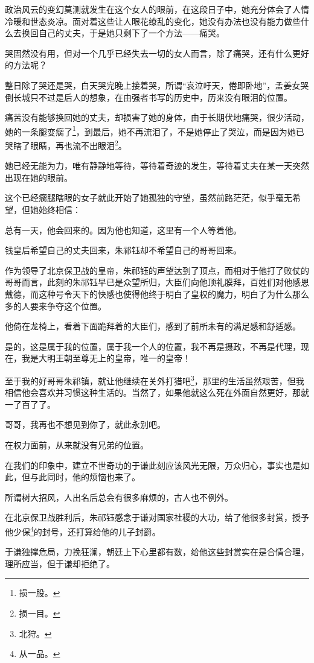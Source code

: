 \begin{multicols}{\theparacolNo}
政治风云的变幻莫测就发生在这个女人的眼前，在这段日子中，她充分体会了人情冷暖和世态炎凉。面对着这些让人眼花缭乱的变化，她没有办法也没有能力做些什么去换回自己的丈夫，于是她只剩下了一个方法——痛哭。

哭固然没有用，但对一个几乎已经失去一切的女人而言，除了痛哭，还有什么更好的方法呢？

整日除了哭还是哭，白天哭完晚上接着哭，所谓“哀泣吁天，倦即卧地”，孟姜女哭倒长城只不过是后人的想象，在由强者书写的历史中，历来没有眼泪的位置。

痛苦没有能够换回她的丈夫，却损害了她的身体，由于长期伏地痛哭，很少活动，她的一条腿变瘸了\footnote{损一股。}，到最后，她不再流泪了，不是她停止了哭泣，而是因为她已哭瞎了眼睛，再也流不出眼泪\footnote{损一目。}。

她已经无能为力，唯有静静地等待，等待着奇迹的发生，等待着丈夫在某一天突然出现在她的眼前。

这个已经瘸腿瞎眼的女子就此开始了她孤独的守望，虽然前路茫茫，似乎毫无希望，但她始终相信：

总有一天，他会回来的。因为他也知道，这里有一个人等着他。

钱皇后希望自己的丈夫回来，朱祁钰却不希望自己的哥哥回来。

作为领导了北京保卫战的皇帝，朱祁钰的声望达到了顶点，而相对于他打了败仗的哥哥而言，此刻的朱祁钰早已是众望所归，大臣们向他顶礼膜拜，百姓们对他感恩戴德，而这种号令天下的快感也使得他终于明白了皇权的魔力，明白了为什么那么多的人要来争夺这个位置。

他倚在龙椅上，看着下面跪拜着的大臣们，感到了前所未有的满足感和舒适感。

是的，这是属于我的位置，属于我一个人的位置，我不再是摄政，不再是代理，现在，我是大明王朝至尊无上的皇帝，唯一的皇帝！

至于我的好哥哥朱祁镇，就让他继续在关外打猎吧\footnote{北狩。}，那里的生活虽然艰苦，但我相信他会喜欢并习惯这种生活的。当然了，如果他就这么死在外面自然更好，那就一了百了了。

哥哥，我再也不想见到你了，就此永别吧。

在权力面前，从来就没有兄弟的位置。

在我们的印象中，建立不世奇功的于谦此刻应该风光无限，万众归心，事实也是如此，但与此同时，他的烦恼也来了。

所谓树大招风，人出名后总会有很多麻烦的，古人也不例外。

在北京保卫战胜利后，朱祁钰感念于谦对国家社稷的大功，给了他很多封赏，授予他少保\footnote{从一品。}的封号，还打算给他的儿子封爵。

于谦独撑危局，力挽狂澜，朝廷上下心里都有数，给他这些封赏实在是合情合理，理所应当，但于谦却拒绝了。


\end{multicols}
